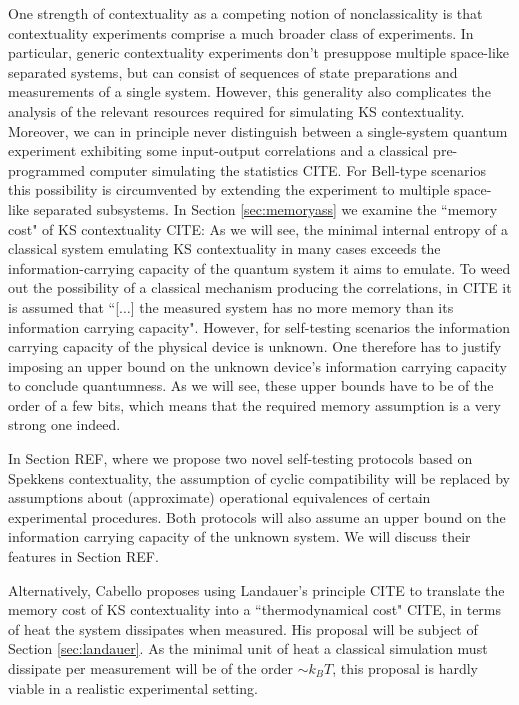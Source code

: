One strength of contextuality as a competing notion of nonclassicality is that contextuality experiments comprise a much broader class of experiments. In particular, generic contextuality experiments don't presuppose multiple space-like separated systems, but can consist of sequences of state preparations and measurements of a single system. However, this generality also complicates the analysis of the relevant resources required for simulating KS contextuality. Moreover, we can in principle never distinguish between a single-system quantum experiment exhibiting some input-output correlations and a classical pre-programmed computer simulating the statistics CITE. For Bell-type scenarios this possibility is circumvented by extending the experiment to multiple space-like separated subsystems. In Section \ref{sec:memoryass} we examine the ``memory cost" of KS contextuality CITE: As we will see, the minimal internal entropy of a classical system emulating KS contextuality in many cases exceeds the information-carrying capacity of the quantum system it aims to emulate. To weed out the possibility of a classical mechanism producing the correlations, in CITE it is assumed that ``[$\dots$] the measured system has no more memory than its information carrying capacity".
However, for self-testing scenarios the information carrying capacity of the physical device is unknown.
One therefore has to justify imposing an upper bound on the unknown device's information carrying capacity to conclude quantumness. As we will see, these upper bounds have to be of the order of a few bits, which means that the required memory assumption is a very strong one indeed. 

In Section REF, where we propose two novel self-testing protocols based on Spekkens contextuality, the assumption of cyclic compatibility will be replaced by assumptions about (approximate) operational equivalences of certain experimental procedures. Both protocols will also assume an upper bound on the information carrying capacity of the unknown system. We will discuss their features in Section REF.

Alternatively, Cabello proposes using Landauer's principle CITE to translate the memory cost of KS contextuality into a ``thermodynamical cost" CITE, in terms of heat the system dissipates when measured. His proposal will be subject of Section \ref{sec:landauer}. As the minimal unit of heat a classical simulation must dissipate per measurement will be of the order $\sim k_BT$, this proposal is hardly viable in a realistic experimental setting.

